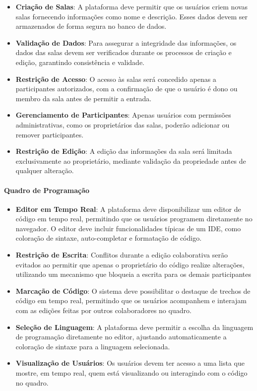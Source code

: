 \begin{itemize}
    \item \textbf{Criação de Salas}: A plataforma deve permitir que os usuários criem novas salas fornecendo informações como nome e descrição. Esses dados devem ser armazenados de forma segura no banco de dados.
    \item \textbf{Validação de Dados}: Para assegurar a integridade das informações, os dados das salas devem ser verificados durante os processos de criação e edição, garantindo consistência e validade.
    \item \textbf{Restrição de Acesso}: O acesso às salas será concedido apenas a participantes autorizados, com a confirmação de que o usuário é dono ou membro da sala antes de permitir a entrada.
    \item \textbf{Gerenciamento de Participantes}: Apenas usuários com permissões administrativas, como os proprietários das salas, poderão adicionar ou remover participantes.
    \item \textbf{Restrição de Edição}: A edição das informações da sala será limitada exclusivamente ao proprietário, mediante validação da propriedade antes de qualquer alteração.
\end{itemize}

\paragraph{Quadro de Programação}

\begin{itemize}
    \item \textbf{Editor em Tempo Real}: A plataforma deve disponibilizar um editor de código em tempo real, permitindo que os usuários programem diretamente no navegador. O editor deve incluir funcionalidades típicas de um IDE, como coloração de sintaxe, auto-completar e formatação de código.
    \item \textbf{Restrição de Escrita}: Conflitos durante a edição colaborativa serão evitados ao permitir que apenas o proprietário do código realize alterações, utilizando um mecanismo que bloqueia a escrita para os demais participantes
    \item \textbf{Marcação de Código}: O sistema deve possibilitar o destaque de trechos de código em tempo real, permitindo que os usuários acompanhem e interajam com as edições feitas por outros colaboradores no quadro.
    \item \textbf{Seleção de Linguagem}: A plataforma deve permitir a escolha da linguagem de programação diretamente no editor, ajustando automaticamente a coloração de sintaxe para a linguagem selecionada.
    \item \textbf{Visualização de Usuários}: Os usuários devem ter acesso a uma lista que mostre, em tempo real, quem está visualizando ou interagindo com o código no quadro.
\end{itemize}

